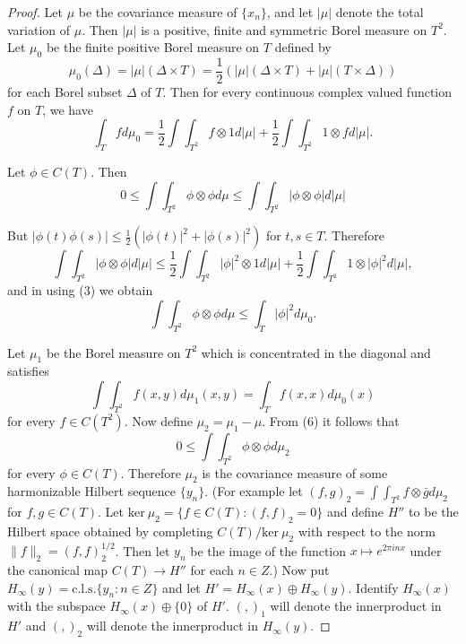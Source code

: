 \documentclass{article}
\begin{document}
\begin{proof}
Let $\mu$ be the covariance measure of $\{x_n\}$, and let $|\mu|$ denote the total
variation of $\mu$. Then $|\mu|$ is a positive, finite and symmetric Borel measure on $T^2$.
Let $\mu_0$ be the finite positive Borel measure on $T$ defined by
\begin{equation}
\mu_0(\Delta) = |\mu|(\Delta \times T) = \frac{1}{2}(|\mu|(\Delta \times T) + |\mu|(T \times \Delta))
\end{equation}
for each Borel subset $\Delta$ of $T$. Then for every continuous complex valued function $f$ on $T$, we have
\begin{equation}
\int_T f d\mu_0 = \frac{1}{2} \int \int_{T^2} f \otimes 1 d|\mu| + \frac{1}{2} \int \int_{T^2} 1 \otimes f d|\mu|.
\end{equation}

Let $\phi \in C(T)$. Then
\begin{equation}
0 \leq \int \int_{T^2} \phi \otimes \phi d\mu \leq \int \int_{T^2} |\phi \otimes \phi| d|\mu|
\end{equation}

But $|\phi(t)\phi(s)| \leq \frac{1}{2}(|\phi(t)|^2 + |\phi(s)|^2)$ for $t, s \in T$. Therefore
\begin{equation}
\int \int_{T^2} |\phi \otimes \phi| d|\mu| \leq \frac{1}{2} \int \int_{T^2} |\phi|^2 \otimes 1 d|\mu| + \frac{1}{2} \int \int_{T^2} 1 \otimes |\phi|^2 d|\mu|,
\end{equation}
and in using (3) we obtain
\begin{equation}
\int \int_{T^2} \phi \otimes \phi d\mu \leq \int_T |\phi|^2 d\mu_0.
\end{equation}

Let $\mu_1$ be the Borel measure on $T^2$ which is concentrated in the diagonal and
satisfies
\begin{equation}
\int \int_{T^2} f(x, y) d\mu_1(x, y) = \int_T f(x, x) d\mu_0(x)
\end{equation}
for every $f \in C(T^2)$. Now define $\mu_2 = \mu_1 - \mu$.
From (6) it follows that
\begin{equation}
0 \leq \int \int_{T^2} \phi \otimes \phi d\mu_2
\end{equation}
for every $\phi \in C(T)$. Therefore $\mu_2$ is the covariance measure of some harmonizable
Hilbert sequence $\{y_n\}$. (For example let $(f, g)_2 = \int \int_{T^2} f \otimes \bar{g} d\mu_2$ for $f, g \in C(T)$.
Let $\text{ker}\ \mu_2 = \{f \in C(T): (f, f)_2 = 0\}$ and define $H''$ to be the Hilbert space obtained by completing $C(T)/\text{ker}\ \mu_2$ with respect to the norm $\|f\|_2 = (f, f)_2^{1/2}$. Then let $y_n$ be the image of the function $x \mapsto e^{2\pi inx}$ under the canonical map
$C(T) \to H''$ for each $n \in Z$.) Now put $H_{\infty}(y) = \text{c.l.s.}\{y_n:n \in Z\}$ and let
$H' = H_{\infty}(x) \oplus H_{\infty}(y)$. Identify $H_{\infty}(x)$ with the subspace $H_{\infty}(x) \oplus \{0\}$ of $H'$.
$(,)_1$ will denote the innerproduct in $H'$ and $(,)_2$ will denote the innerproduct
in $H_{\infty}(y)$.


\end{proof}
\end{document}

